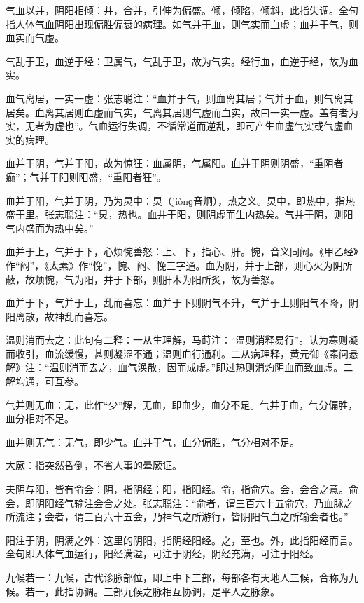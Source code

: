 \documentclass[draft,12pt]{ctexbook}
\begin{document}
\begin{jiaozhu}
	\item 气血以并，阴阳相倾：并，合并，引伸为偏盛。倾，倾陷，倾斜，此指失调。全句指人体气血阴阳出现偏胜偏衰的病理。如气并于血，则气实而血虚；血并于气，则血实而气虚。
	\item 气乱于卫，血逆于经：卫属气，气乱于卫，故为气实。经行血，血逆于经，故为血实。
	\item 血气离居，一实一虚：张志聪注：“血并于气，则血离其居；气并于血，则气离其居矣。血离其居则血虚而气实，气离其居则气虚而血实，故曰一实一虚。盖有者为实，无者为虚也”。气血运行失调，不循常道而逆乱，即可产生血虚气实或气虚血实的病理。
	\item 血并于阴，气并于阳，故为惊狂：血属阴，气属阳。血并于阴则阴盛，“重阴者癫”；气并于阳则阳盛，“重阳者狂”。
	\item 血并于阳，气并于阴，乃为炅中：炅（jiǒnɡ音炯），热之义。炅中，即热中，指热盛于里。张志聪注：“炅，热也。血并于阳，则阴虚而生内热矣。气并于阴，则阳气内盛而为热中矣。”
	\item 血并于上，气并于下，心烦惋善怒：上、下，指心、肝。惋，音义同闷。《甲乙经》作“闷”，《太素》作“悗”，惋、闷、悗三字通。血为阴，并于上部，则心火为阴所蔽，故烦惋，气为阳，并于下部，则肝木为阳所炙，故为善怒。
	\item 血并于下，气并于上，乱而喜忘：血并于下则阴气不升，气并于上则阳气不降，阴阳离散，故神乱而喜忘。
	\item 温则消而去之：此句有二释：一从生理解，马莳注：“温则消释易行”。认为寒则凝而收引，血流缓慢，甚则凝涩不通；温则血行通利。二从病理释，黄元御《素问悬解》注：“温则消而去之，血气涣散，因而成虚。”即过热则消灼阴血而致血虚。二解均通，可互参。
	\item 气并则无血：无，此作“少”解，无血，即血少，血分不足。气并于血，气分偏胜，血分相对不足。
	\item 血并则无气：无气，即少气。血并于气，血分偏胜，气分相对不足。
	\item 大厥：指突然昏倒，不省人事的晕厥证。
	\item 夫阴与阳，皆有俞会：阴，指阴经；阳，指阳经。俞，指俞穴。会，会合之意。俞会，即阴阳经气输注会合之处。张志聪注：“俞者，谓三百六十五俞穴，乃血脉之所流注；会者，谓三百六十五会，乃神气之所游行，皆阴阳气血之所输会者也。”
	\item 阳注于阴，阴满之外：这里的阴阳，指阴经阳经。之，至也。外，此指阳经而言。全句即人体气血运行，阳经满溢，可注于阴经，阴经充满，可注于阳经。
	\item 九候若一：九候，古代诊脉部位，即上中下三部，每部各有天地人三候，合称为九候。若一，此指协调。三部九候之脉相互协调，是平人之脉象。

\end{jiaozhu}
\end{document}
